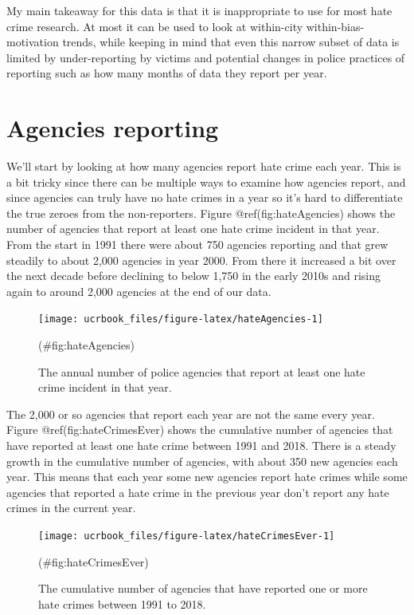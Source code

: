 \documentclass[
  12pt,
  openany]{book}
\begin{document}
My main takeaway for this data is that it is inappropriate to use for most hate crime research. At most it can be used to look at within-city within-bias-motivation trends, while keeping in mind that even this narrow subset of data is limited by under-reporting by victims and potential changes in police practices of reporting such as how many months of data they report per year.

\hypertarget{agencies-reporting-6}{%
\section{Agencies reporting}\label{agencies-reporting-6}}

We'll start by looking at how many agencies report hate crime each year. This is a bit tricky since there can be multiple ways to examine how agencies report, and since agencies can truly have no hate crimes in a year so it's hard to differentiate the true zeroes from the non-reporters. Figure @ref(fig:hateAgencies) shows the number of agencies that report at least one hate crime incident in that year. From the start in 1991 there were about 750 agencies reporting and that grew steadily to about 2,000 agencies in year 2000. From there it increased a bit over the next decade before declining to below 1,750 in the early 2010s and rising again to around 2,000 agencies at the end of our data.

\begin{figure}

{\centering \texttt{[image: ucrbook\_files/figure-latex/hateAgencies-1]} 

}

\caption{The annual number of police agencies that report at least one hate crime incident in that year.}(\#fig:hateAgencies)
\end{figure}

The 2,000 or so agencies that report each year are not the same every year. Figure @ref(fig:hateCrimesEver) shows the cumulative number of agencies that have reported at least one hate crime between 1991 and 2018. There is a steady growth in the cumulative number of agencies, with about 350 new agencies each year. This means that each year some new agencies report hate crimes while some agencies that reported a hate crime in the previous year don't report any hate crimes in the current year.

\begin{figure}

{\centering \texttt{[image: ucrbook\_files/figure-latex/hateCrimesEver-1]} 

}

\caption{The cumulative number of agencies that have reported one or more hate crimes between 1991 to 2018.}(\#fig:hateCrimesEver)
\end{figure}
\end{document}
